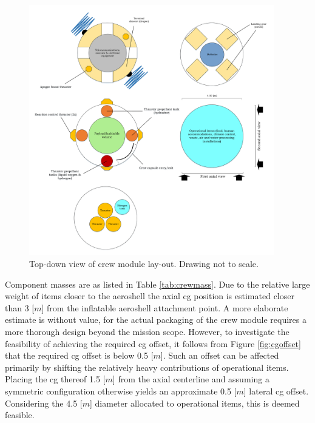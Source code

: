 \begin{figure}[h]
		\centering
		\includegraphics[width=0.95\textwidth]{./Figure/CrewModule/TopviewV2.pdf}
		\caption[Top-down view of crew module lay-out]{Top-down view of crew module lay-out. Drawing not to scale.}
		\label{fig:topview}
\end{figure}

Component masses are as listed in Table \ref{tab:crewmass}. Due to the relative large weight of items closer to the aeroshell the axial \gls{cg} position is estimated closer than 3 [$m$] from the inflatable aeroshell attachment point. A more elaborate estimate is without value, for the actual packaging of the crew module requires a more thorough design beyond the mission scope. However, to investigate the feasibility of achieving the required \gls{cg} offset, it follows from Figure \ref{fig:cgoffset} that the required \gls{cg} offset is below 0.5 [$m$]. Such an offset can be affected primarily by shifting the relatively heavy contributions of operational items. Placing the \gls{cg} thereof 1.5 [$m$] from the axial centerline and assuming a symmetric configuration otherwise yields an approximate 0.5 [$m$] lateral \gls{cg} offset. Considering the 4.5 [$m$] diameter allocated to operational items, this is deemed feasible. %

